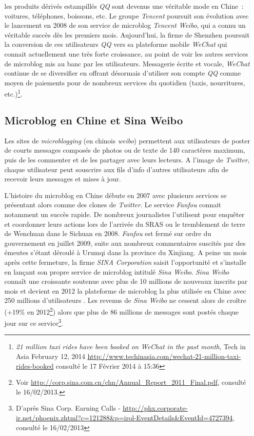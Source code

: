 les produits dérivés estampillés \textit{QQ} sont devenus une véritable mode en Chine : voitures, téléphones, boissons, etc. Le groupe \textit{Tencent} poursuit son évolution avec le lancement en 2008 de son service de microblog \textit{Tencent Weibo}, qui a connu un véritable succès dès les premiers mois. Aujourd’hui, la firme de Shenzhen poursuit la conversion de ces utilisateurs \textit{QQ} vers sa plateforme mobile \textit{WeChat} qui connait actuellement une très forte croissance, au point de voir les autres services de microblog mis au banc par les utilisateurs. Messagerie écrite et vocale, \textit{WeChat} continue de se diversifier en offrant désormais d’utiliser son compte \textit{QQ} comme moyen de paiements pour de nombreux services du quotidien (taxis, nourritures, etc.)\footnote{\textit{21 million taxi rides have been booked on WeChat in the past month}, Tech in Asia February 12, 2014 \url{http://www.techinasia.com/wechat-21-million-taxi-rides-booked} consulté le 17 Février 2014 à 15:36}.

\subsection[Microblog en Chine et Sina Weibo]{Microblog en Chine et Sina Weibo}
Les sites de \textit{microblogging} (en chinois \textit{weibo}) permettent aux utilisateurs de poster de courts messages composés de photos ou de texte de 140 caractères maximum, puis de les commenter et de les partager avec leurs lecteurs. A l’image de \textit{Twitter}, chaque utilisateur peut souscrire aux fils d’info d’autres utilisateurs afin de recevoir leurs messages et mises à jour.

L’histoire du microblog en Chine débute en 2007 avec plusieurs services se présentant alors comme des clones de \textit{Twitter}. Le service \textit{Fanfou} connait notamment un succès rapide. De nombreux journalistes l’utilisent pour enquêter et coordonner leurs actions lors de l’arrivée du SRAS ou le tremblement de terre de Wenchuan dans le Sichuan en 2008. \textit{Fanfou} est fermé sur ordre du gouvernement en juillet 2009, suite aux nombreux commentaires suscités par des émeutes s’étant déroulé à Urumqi dans la province du Xinjiang. A peine un mois après cette fermeture, la firme \textit{SINA Corporation} saisit l’opportunité et s’installe en lançant son propre service de microblog intitulé \textit{Sina Weibo}. \textit{Sina Weibo} connaît une croissante soutenue avec plus de 10 millions de nouveaux inscrits par mois et devient en 2012 la plateforme de microblog la plus utilisée en Chine avec 250 millions d’utilisateurs \citep{McKinsey2012}. Les revenus de \textit{Sina Weibo} ne cessent alors de croître (+19\% en 2012\footnote{Voir \url{http://corp.sina.com.cn/chn/Annual_Report_2011_Final.pdf}, consulté le 16/02/2013.}) alors que plus de 86 millions de messages sont postés chaque jour sur ce service\footnote{D’après Sina Corp. Earning Calls - \url{http://phx.corporate-ir.net/phoenix.zhtml?c=121288&p=irol-EventDetails&EventId=4727394}, consulté le 16/02/2013}. 


